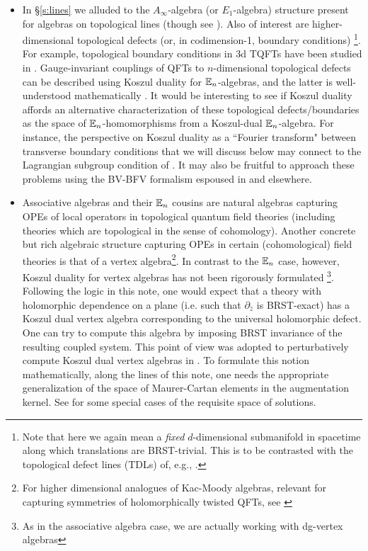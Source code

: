 \documentclass[11pt]{amsart}
\begin{document}
\begin{itemize}

\item In \S \ref{s:lines} we alluded to the $A_\infty$-algebra (or $E_1$-algebra) structure present for algebras on topological lines (though see \cite{GO}). Also of interest are higher-dimensional topological defects (or, in codimension-1, boundary conditions) \footnote{Note that here we again mean a \textit{fixed} $d$-dimensional submanifold in spacetime along which translations are BRST-trivial. This is to be contrasted with the topological defect lines (TDLs) of, e.g., \cite{Yinetal}.}. For example, topological boundary conditions in 3d TQFTs have been studied in \cite{KS, BM, Kaidietal}. Gauge-invariant couplings of QFTs to $n$-dimensional topological defects can be described using Koszul duality for $\mathbb E_n$-algebras, and the latter is well-understood mathematically \cite{lurie2011formal}. It would be interesting to see if Koszul duality affords an alternative characterization of these topological defects/boundaries as the space of $\mathbb E_n$-homomorphisms from a Koszul-dual $\mathbb E_n$-algebra. For instance, the perspective on Koszul duality as a ``Fourier transform" between transverse boundary conditions that we will discuss below may connect to the Lagrangian subgroup condition of \cite{KS}. It may also be fruitful to approach these problems using the BV-BFV formalism espoused in \cite{Cattaneo:2020lle} and elsewhere. 

\item Associative algebras and their $\mathbb E_n$ cousins are natural algebras capturing OPEs of local operators in topological quantum field theories (including theories which are topological in the sense of cohomology).  Another concrete but rich algebraic structure capturing OPEs in certain (cohomological) field theories is that of a vertex algebra\footnote{For higher dimensional analogues of Kac-Moody algebras, relevant for capturing symmetries of holomorphically twisted QFTs, see \cite{GW}}. In contrast to the $\mathbb E_n$ case, however, Koszul duality for vertex algebras has not been rigorously formulated \footnote{As in the associative algebra case, we are actually working with dg-vertex algebras}. Following the logic in this note, one would expect that a theory with holomorphic dependence on a plane (i.e. such that $\partial_{\bar{z}}$ is BRST-exact) has a Koszul dual vertex algebra corresponding to the universal holomorphic defect. One can try to compute this algebra by imposing BRST invariance of the resulting coupled system. This point of view was adopted to perturbatively compute Koszul dual vertex algebras in \cite{CP}. To formulate this notion mathematically, along the lines of this note, one needs the appropriate generalization of the space of Maurer-Cartan elements in the augmentation kernel. See \cite{Li} for some special cases of the requisite space of solutions.  


\end{itemize}
\end{document}
